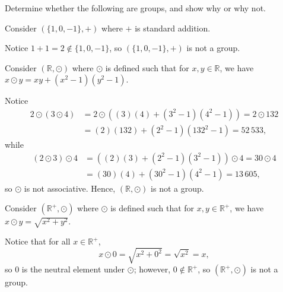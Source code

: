 Determine whether the following are groups, and show why or why not.
\begin{exer}
Consider $ (\{1,0,-1\},+) $ where $ + $ is standard addition.
\end{exer}
\begin{sltn}
Notice $ 1+1=2\notin\{1,0,-1\} $, so $ (\{1,0,-1\},+) $ is not a group.
\end{sltn}

\begin{exer}
Consider $ (\mathbb{R},\odot) $ where $ \odot $ is defined such that for $ x,y\in\mathbb{R} $, we have $ x\odot y=xy+(x^2-1)(y^2-1) $.
\end{exer}
\begin{sltn}
Notice
\begin{align*}
    2\odot(3\odot 4) &= 2\odot\left((3)(4)+(3^2-1)(4^2-1)\right)=2\odot 132 \\
    &= (2)(132)+(2^2-1)(132^2-1)=52\,533,
\end{align*}
while
\begin{align*}
    (2\odot 3)\odot 4 &= \left((2)(3)+(2^2-1)(3^2-1)\right)\odot 4=30\odot 4 \\
    &= (30)(4)+(30^2-1)(4^2-1)=13\,605,
\end{align*}
so $ \odot $ is not associative. Hence, $ (\mathbb{R},\odot) $ is not a group.
\end{sltn}

\begin{exer}
Consider $ (\mathbb{R}^+,\odot) $ where $ \odot $ is defined such that for $ x,y\in\mathbb{R}^+ $, we have $ x\odot y=\sqrt{x^2+y^2} $.
\end{exer}
\begin{sltn}
Notice that for all $ x\in\mathbb{R}^+ $,
\begin{equation*}
    x\odot 0=\sqrt{x^2+0^2}=\sqrt{x^2}=x,
\end{equation*}
so $ 0 $ is the neutral element under $ \odot $; however, $ 0\notin\mathbb{R}^+ $, so $ (\mathbb{R}^+,\odot) $ is not a group.
\end{sltn}

